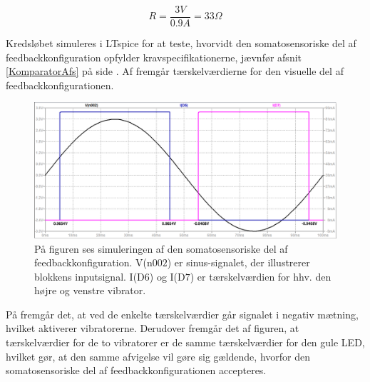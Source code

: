 \begin{equation} \label{vibrator_modstand}
R = \dfrac{3V}{0.9A} = 33\Omega
\end{equation}

\noindent Kredsløbet simuleres i LTspice for at teste, hvorvidt den somatosensoriske del af feedbackkonfiguration opfylder kravspecifikationerne, jævnfør afsnit \ref{KomparatorAfs} på side \pageref{KomparatorAfs}. Af  fremgår tærskelværdierne for den visuelle del af feedbackkonfigurationen.

\begin{figure}[H]
	\centering
	\includegraphics[scale=0.3]{figures/cProblemloesning/vibration_graf.PNG}
	\caption{På figuren ses simuleringen af den somatosensoriske del af feedbackkonfiguration. V(n$002$) er sinus-signalet, der illustrerer blokkens inputsignal. I(D$6$) og I(D$7$) er tærskelværdien for hhv. den højre og venstre vibrator.}
	\label{fig:vibration_graf}
\end{figure}
\noindent På  fremgår det, at ved de enkelte tærskelværdier går signalet i negativ mætning, hvilket aktiverer vibratorerne. Derudover fremgår det af figuren, at tærskelværdier for de to vibratorer er de samme tærskelværdier for den gule LED, hvilket gør, at den samme afvigelse vil gøre sig gældende, hvorfor den somatosensoriske del af feedbackkonfigurationen accepteres. 

